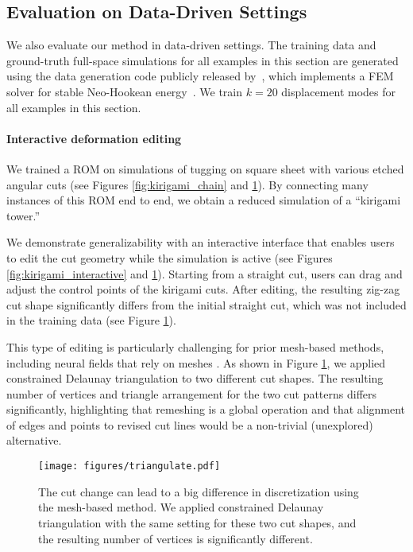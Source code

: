 \subsection{Evaluation on Data-Driven Settings}
We also evaluate our method in data-driven settings. The training data and ground-truth full-space simulations for all examples in this section are generated using the data generation code publicly released by~\citet{chang:2023:licrom}, which implements a FEM solver for stable Neo-Hookean energy~\cite{Smith:2018:stablenh}. We train $k=20$ displacement modes for all examples in this section. 

\paragraph{Interactive deformation editing}

We trained a ROM on simulations of tugging on square sheet with various etched angular cuts (see Figures \ref{fig:kirigami_chain} and \ref{fig:remeshing}). By connecting many instances of this ROM end to end, we obtain a reduced simulation of a ``kirigami tower.''

We demonstrate generalizability with an interactive interface that enables users to edit the cut geometry while the simulation is active (see Figures \ref{fig:kirigami_interactive} and \ref{fig:remeshing}). Starting from a straight cut, users can drag and adjust the control points of the kirigami cuts. After editing, the resulting zig-zag cut shape significantly differs from the initial straight cut, which was not included in the training data (see Figure \ref{fig:remeshing}). 

This type of editing is particularly challenging for prior mesh-based methods, including neural fields that rely on meshes \cite{Belhe:2023:DiscontinuityAwareNeuralFields}. As shown in Figure \ref{fig:remeshing}, we applied constrained Delaunay triangulation \cite{Richard:2005:triangle} to two different cut shapes. The resulting number of vertices and triangle arrangement for the two cut patterns differs significantly, highlighting that remeshing is a global operation and that alignment of edges and points to revised cut lines would be a non-trivial (unexplored) alternative.








\begin{figure}
\centering
\texttt{[image: figures/triangulate.pdf]}
\caption{The cut change can lead to a big difference in discretization using the mesh-based method. We applied constrained Delaunay triangulation with the same setting for these two cut shapes, and the resulting number of vertices is significantly different.}
\label{fig:remeshing}
\end{figure}




